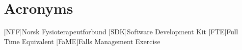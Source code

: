\chapter*{Acronyms}
\begin{acronym}
[NFF]{Norsk Fysioterapeutforbund}
[SDK]{Software Development Kit}
[FTE]{Full Time Equivalent}
[FaME]{Falls Management Exercise}
\end{acronym}


